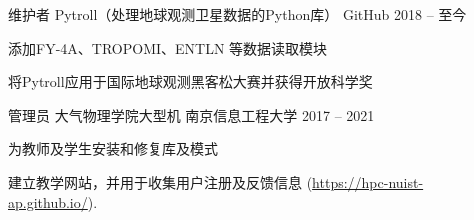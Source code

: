 

\begin{cventries}

  \cventry
    {维护者} %
    {Pytroll（处理地球观测卫星数据的Python库）} %
    {GitHub} %
    {2018 -- 至今} %
    {
      \begin{cvitems} %
        \item {添加FY-4A、TROPOMI、ENTLN 等数据读取模块}
        \item {将Pytroll应用于国际地球观测黑客松大赛并获得开放科学奖}
      \end{cvitems}
    }

  \cventry
    {管理员} %
    {大气物理学院大型机} %
    {南京信息工程大学} %
    {2017 -- 2021} %
    {
      \begin{cvitems} %
        \item {为教师及学生安装和修复库及模式}
        \item {建立教学网站，并用于收集用户注册及反馈信息 (\hypersetup{hidelinks}\url{https://hpc-nuist-ap.github.io/}).}
      \end{cvitems}
    }

\end{cventries}

